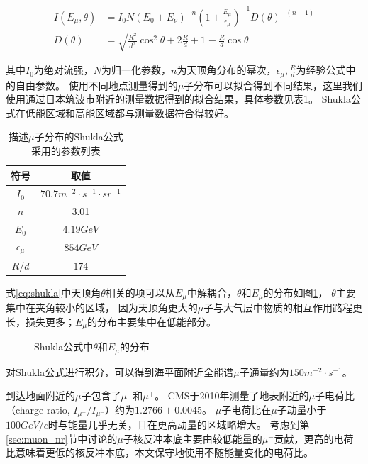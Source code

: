 \begin{align}
    \label{eq:shukla}
    I\left(E_\mu,\theta\right) &= I_0 N\left(E_0+E_\nu\right)^{-n}\left(1 + \frac{E_\mu}{\epsilon_\mu}\right)^{-1}D(\theta)^{-(n-1)} \\
    D(\theta) &= \sqrt{\frac{R^2}{d^2}\cos^2\theta+2\frac{R}{d}+1}-\frac{R}{d}\cos\theta
\end{align}

其中$I_0$为绝对流强，$N$为归一化参数，$n$为天顶角分布的幂次，$\epsilon_\mu,\frac{R}{d}$为经验公式中的自由参数。
使用不同地点测量得到的$\mu$子分布可以拟合得到不同结果，这里我们使用通过日本筑波市附近的测量数据得到的拟合结果，具体参数见表\ref{tab:shukla}。
Shukla公式在低能区域和高能区域都与测量数据符合得较好。

\begin{table}
  \centering
  \caption{描述$\mu$子分布的Shukla公式采用的参数列表}
  \begin{tabular}{cc}
    \toprule
    符号 & 取值 \\
    \midrule
    $I_0$ & $70.7\si{m^{-2}\cdot s^{-1}\cdot sr^{-1}}$ \\
    $n$ & 3.01 \\
    $E_0$ & $4.19\si{GeV}$ \\
    $\epsilon_\mu$ & $854\si{GeV}$ \\
    $R/d$ & $174$ \\
    \bottomrule
  \end{tabular}
  \label{tab:shukla}
\end{table}

式\ref{eq:shukla}中天顶角$\theta$相关的项可以从$E_\mu$中解耦合，$\theta$和$E_\mu$的分布如图\ref{fig:shukla_distribution}，
$\theta$主要集中在夹角较小的区域，
因为天顶角更大的$\mu$子与大气层中物质的相互作用路程更长，损失更多；$E_\mu$的分布主要集中在低能部分。

\begin{figure}
    \centering
    
    \caption{\label{fig:shukla_distribution} Shukla公式中$\theta$和$E_\mu$的分布}
\end{figure}

对Shukla公式进行积分，可以得到海平面附近全能谱$\mu$子通量约为$150\si{m^{-2}\cdot s^{-1}}$。

到达地面附近的$\mu$子包含了$\mu^-$和$\mu^+$。
CMS于2010年测量了地表附近的$\mu$子电荷比（charge ratio, $I_{\mu^+}/I_{\mu^-}$）约为$1.2766\pm0.0045$\cite{the_cms_collaboration_measurement_2010}。
$\mu$子电荷比在$\mu$子动量小于$100\si{GeV/c}$时与能量几乎无关，且在更高动量的区域略增大。
考虑到第\ref{sec:muon_nr}节中讨论的$\mu$子核反冲本底主要由较低能量的$\mu^-$贡献，更高的电荷比意味着更低的核反冲本底，本文保守地使用不随能量变化的电荷比。

